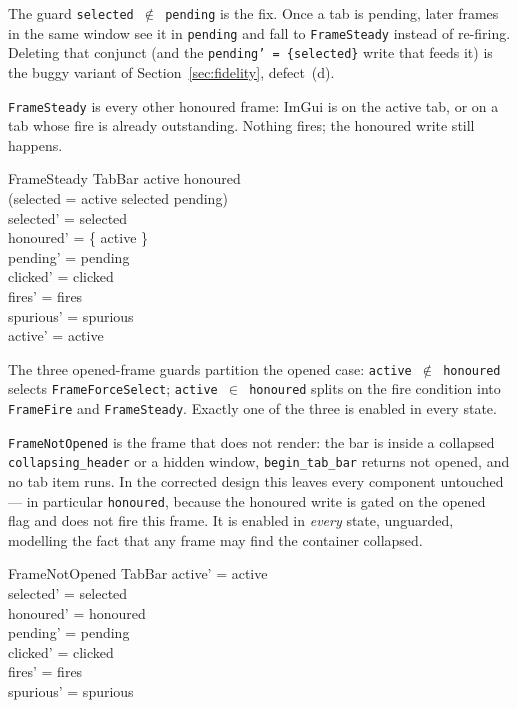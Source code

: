 \documentclass[a4paper,10pt,fleqn]{article}
\begin{document}
The guard \texttt{selected $\notin$ pending} is the fix.  Once a tab is
pending, later frames in the same window see it in \texttt{pending} and fall
to \texttt{FrameSteady} instead of re-firing.  Deleting that conjunct (and the
\texttt{pending' = \{selected\}} write that feeds it) is the buggy variant of
Section~\ref{sec:fidelity}, defect~(d).

\texttt{FrameSteady} is every other honoured frame: ImGui is on the active tab,
or on a tab whose fire is already outstanding.  Nothing fires; the honoured
write still happens.

\begin{schema}{FrameSteady}
  \Delta TabBar
\where
  active \in honoured \\
  (selected = active \lor selected \in pending) \\
  selected' = selected \\
  honoured' = \{ active \} \\
  pending' = pending \\
  clicked' = clicked \\
  fires' = fires \\
  spurious' = spurious \\
  active' = active
\end{schema}

The three opened-frame guards partition the opened case: \texttt{active
$\notin$ honoured} selects \texttt{FrameForceSelect}; \texttt{active $\in$
honoured} splits on the fire condition into \texttt{FrameFire} and
\texttt{FrameSteady}.  Exactly one of the three is enabled in every state.

\texttt{FrameNotOpened} is the frame that does not render: the bar is inside a
collapsed \texttt{collapsing\_header} or a hidden window, \texttt{begin\_tab\_bar}
returns not opened, and no tab item runs.  In the corrected design this leaves
every component untouched --- in particular \texttt{honoured}, because the
honoured write is gated on the opened flag and does not fire this frame.  It is
enabled in \emph{every} state, unguarded, modelling the fact that any frame may
find the container collapsed.

\begin{schema}{FrameNotOpened}
  \Delta TabBar
\where
  active' = active \\
  selected' = selected \\
  honoured' = honoured \\
  pending' = pending \\
  clicked' = clicked \\
  fires' = fires \\
  spurious' = spurious
\end{schema}
\end{document}
